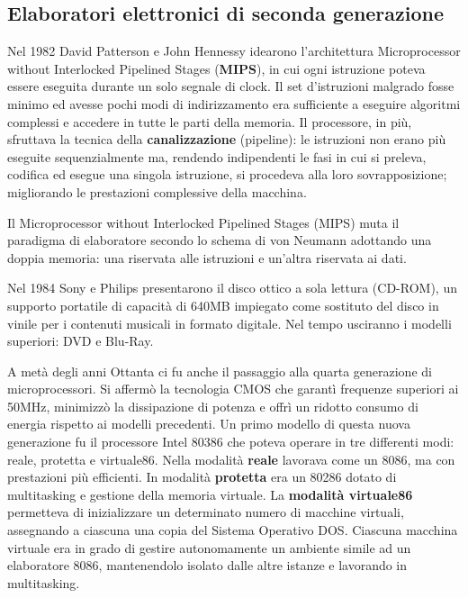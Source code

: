 \documentclass[12pt]{article} %
\begin{document}
\subsection{Elaboratori elettronici di seconda generazione}
Nel 1982 David Patterson e John Hennessy idearono l’architettura Microprocessor without Interlocked Pipelined Stages (\textbf{MIPS}), in cui ogni istruzione poteva essere eseguita durante un solo segnale di clock. Il set d’istruzioni malgrado fosse minimo ed avesse pochi modi di indirizzamento era sufficiente a eseguire algoritmi complessi e accedere in tutte le parti della memoria. Il processore, in più, sfruttava la tecnica della \textbf{canalizzazione} (pipeline): le istruzioni non erano più eseguite sequenzialmente ma, rendendo indipendenti le fasi in cui si preleva, codifica ed esegue una singola istruzione, si procedeva alla loro sovrapposizione; migliorando le prestazioni complessive della macchina.\par\medskip\noindent
Il Microprocessor without Interlocked Pipelined Stages (MIPS) muta il paradigma di elaboratore secondo lo schema di von Neumann adottando una doppia memoria: una riservata alle istruzioni e un’altra riservata ai dati.\par\medskip\noindent
Nel 1984 Sony e Philips presentarono il disco ottico a sola lettura (CD-ROM), un supporto portatile di capacità di 640MB impiegato come sostituto del disco in vinile per i contenuti musicali in formato digitale. Nel tempo usciranno i modelli superiori: DVD e Blu-Ray.\par\medskip\noindent
A metà degli anni Ottanta ci fu anche il passaggio alla quarta generazione di microprocessori. Si affermò la tecnologia CMOS che garantì frequenze superiori ai 50MHz, minimizzò la dissipazione di potenza e offrì un ridotto consumo di energia rispetto ai modelli precedenti. Un primo modello di questa nuova generazione fu il processore Intel 80386 che poteva operare in tre differenti modi: reale, protetta e virtuale86. Nella modalità \textbf{reale} lavorava come un 8086, ma con prestazioni più efficienti. In modalità \textbf{protetta} era un 80286 dotato di multitasking e gestione della memoria virtuale. La\textbf{ modalità virtuale86 }permetteva di inizializzare un determinato numero di macchine virtuali, assegnando a ciascuna una copia del Sistema Operativo DOS. Ciascuna macchina virtuale era in grado di gestire autonomamente un ambiente simile ad un elaboratore 8086, mantenendolo isolato dalle altre istanze e lavorando in multitasking.\par\medskip\noindent
\end{document}
